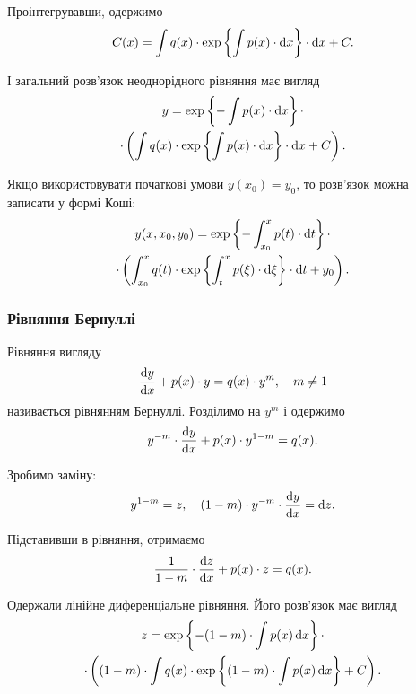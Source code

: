 Проінтегрувавши, одержимо
\begin{equation} 
	\label{eq:1.3.5}
	C(x) = \int q(x) \cdot \exp \left\{\int p(x) \cdot \mathop{}\!\mathrm{d} x \right\} \cdot \mathop{}\!\mathrm{d} x + C.
\end{equation}

І загальний розв’язок неоднорідного рівняння має вигляд
\begin{multline} 
	\label{eq:1.3.6}
	y = \exp \left\{ - \int p(x) \cdot \mathop{}\!\mathrm{d} x \right\} \cdot \\
	\cdot \left( \int q(x) \cdot \exp \left\{\int p(x) \cdot \mathop{}\!\mathrm{d} x \right\} \cdot \mathop{}\!\mathrm{d} x + C\right).
\end{multline}

Якщо використовувати початкові умови $y(x_0) = y_0$, то розв’язок можна записати у формі Коші:
\begin{multline} 
	\label{eq:1.3.7}
	y(x, x_0, y_0) = \exp \left\{ - \int_{x_0}^x p(t) \cdot \mathop{}\!\mathrm{d} t \right\} \cdot \\
	\cdot \left( \int_{x_0}^x q(t) \cdot \exp \left\{\int_t^x p(\xi) \cdot \mathop{}\!\mathrm{d} \xi \right\} \cdot \mathop{}\!\mathrm{d} t + y_0\right).
\end{multline}

\subsubsection{Рівняння Бернуллі}

Рівняння вигляду
\begin{equation}
	\label{eq:1.3.8}
	\frac{\mathop{}\!\mathrm{d} y}{\mathop{}\!\mathrm{d} x} + p(x) \cdot y = q(x) \cdot y^m, \quad m \ne 1
\end{equation}
називається рівнянням Бернуллі. Розділимо на $y^m$ і одержимо 
\begin{equation}
	\label{eq:1.3.9}
	y^{-m} \cdot \frac{\mathop{}\!\mathrm{d} y}{\mathop{}\!\mathrm{d} x} + p(x) \cdot y^{1-m} = q(x).
\end{equation}

Зробимо заміну: 
\begin{equation}
	\label{eq:1.3.9_5}
	y^{1-m} = z, \quad (1 - m) \cdot y^{-m} \cdot \frac{\mathop{}\!\mathrm{d} y}{\mathop{}\!\mathrm{d} x} = \mathop{}\!\mathrm{d} z.
\end{equation}

Підставивши в рівняння, отримаємо
\begin{equation}
	\label{eq:1.3.10}
	\frac{1}{1-m} \cdot \frac{\mathop{}\!\mathrm{d} z}{\mathop{}\!\mathrm{d} x} + p(x) \cdot z = q(x).
\end{equation}

Одержали лінійне диференціальне рівняння. Його розв’язок має вигляд
\begin{multline}
	\label{eq:1.3.11}
	z = \exp\left\{ -(1 - m) \cdot \int p(x) \mathop{}\!\mathrm{d} x \right\} \cdot \\
	\cdot \left( (1-m) \cdot \int q(x) \cdot \exp\left\{ (1 - m) \cdot \int p(x) \mathop{}\!\mathrm{d} x \right\} + C\right).
\end{multline}
 
